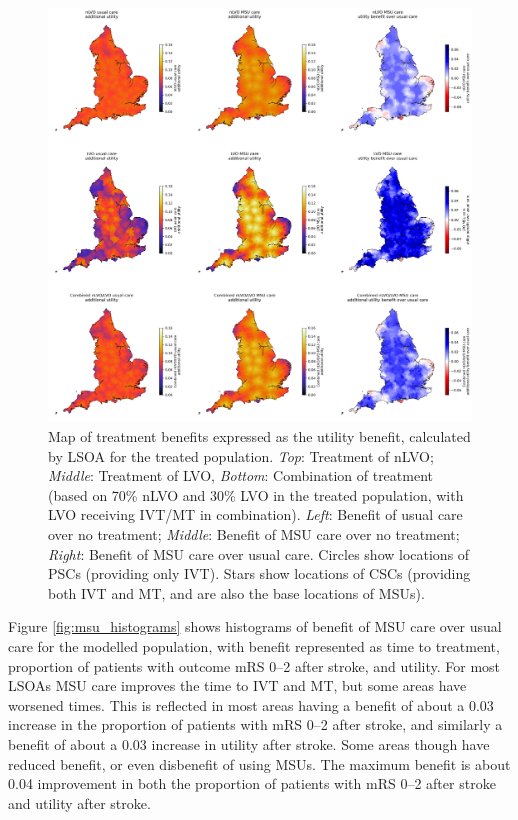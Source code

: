 \begin{figure}[h!]
    \centering
    \includegraphics[width=1\linewidth]{images/map_utility.jpg}
    \caption{Map of treatment benefits expressed as the  utility benefit, calculated by LSOA for the treated population. \textit{Top}: Treatment of nLVO; \textit{Middle}: Treatment of LVO, \textit{Bottom}: Combination of treatment (based on 70\% nLVO and 30\% LVO in the treated population, with LVO receiving IVT/MT in combination). \textit{Left}: Benefit of usual care over no treatment; \textit{Middle}: Benefit of MSU care over no treatment; \textit{Right}: Benefit of MSU care over usual care. Circles show locations of PSCs (providing only IVT). Stars show locations of CSCs (providing both IVT and MT, and are also the base locations of MSUs).}
    \label{fig:msu_map_utility}
\end{figure}


Figure \ref{fig:msu_histograms} shows histograms of benefit of MSU care over usual care for the modelled population, with benefit represented as time to treatment, proportion of patients with outcome mRS 0--2 after stroke, and utility. For most LSOAs MSU care improves the time to IVT and MT, but some areas have worsened times. This is reflected in most areas having a benefit of about a 0.03 increase in the proportion of patients with mRS 0--2 after stroke, and similarly a benefit of about a 0.03 increase in utility after stroke. Some areas though have reduced benefit, or even disbenefit of using MSUs. The maximum benefit is about 0.04 improvement in both the proportion of patients with mRS 0--2 after stroke and utility after stroke.

